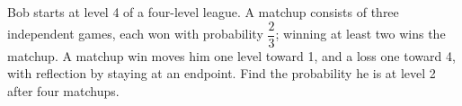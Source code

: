 Bob starts at level 4 of a four-level league. A matchup consists of three independent games, each won with probability $\dfrac{2}{3}$; winning at least two wins the matchup. A matchup win moves him one level toward 1, and a loss one toward 4, with reflection by staying at an endpoint. Find the probability he is at level 2 after four matchups.
